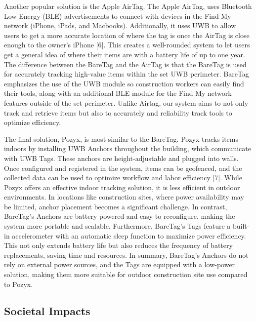 \documentclass[conference]{IEEEtran}
\begin{document}
Another popular solution is the Apple AirTag.
The Apple AirTag, uses Bluetooth Low Energy (BLE) advertisements to connect
with devices in the Find My network (iPhone, iPads, and Macbooks). 
Additionally, it uses UWB to allow users to get a more accurate location of where 
the tag is once the AirTag is close enough to the owner's iPhone [6]. This 
creates a well-rounded system to let users get a general idea of where 
their items are with a battery life of up to one year. The difference 
between the BareTag and the AirTag is that the BareTag is used for 
accurately tracking high-value items within the set UWB perimeter. 
BareTag emphasizes the use of the UWB module so construction workers 
can easily find their tools, along with an additional BLE module for 
the Find My network features outside of the set perimeter. Unlike Airtag, 
our system aims to not only track and retrieve items but also to accurately 
and reliability track tools to optimize efficiency.

The final solution, Pozyx, is most similar to the BareTag. Pozyx tracks 
items indoors by installing UWB Anchors throughout the building, which 
communicate with UWB Tags. These anchors are height-adjustable and 
plugged into walls. Once configured and registered in the system, 
items can be geofenced, and the collected data can be used to optimize 
workflow and labor efficiency [7]. While Pozyx offers an effective 
indoor tracking solution, it is less efficient in outdoor environments. 
In locations like construction sites, where power availability may be 
limited, anchor placement becomes a significant challenge. In contrast, 
BareTag’s Anchors are battery powered and easy to reconfigure, 
making the system more portable and scalable. 
Furthermore, BareTag’s Tags feature a built-in accelerometer with an 
automatic sleep function to maximize power efficiency. This not only 
extends battery life but also reduces the frequency of battery 
replacements, saving time and resources. In summary, BareTag's Anchors 
do not rely on external power sources, and the Tags are equipped with a 
low-power solution, making them more suitable for outdoor construction 
site use compared to Pozyx.

\subsection{Societal Impacts}
\end{document}
